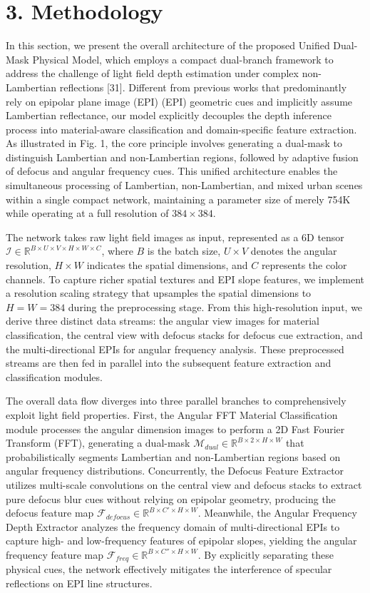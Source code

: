 \section{3. Methodology}

In this section, we present the overall architecture of the proposed Unified Dual-Mask Physical Model, which employs a compact dual-branch framework to address the challenge of light field depth estimation under complex non-Lambertian reflections [31]. Different from previous works that predominantly rely on epipolar plane image (EPI) (EPI) geometric cues and implicitly assume Lambertian reflectance, our model explicitly decouples the depth inference process into material-aware classification and domain-specific feature extraction. As illustrated in Fig. 1, the core principle involves generating a dual-mask to distinguish Lambertian and non-Lambertian regions, followed by adaptive fusion of defocus and angular frequency cues. This unified architecture enables the simultaneous processing of Lambertian, non-Lambertian, and mixed urban scenes within a single compact network, maintaining a parameter size of merely 754K while operating at a full resolution of $384 \times 384$.

The network takes raw light field images as input, represented as a 6D tensor $\mathcal{I} \in \mathbb{R}^{B \times U \times V \times H \times W \times C}$, where $B$ is the batch size, $U \times V$ denotes the angular resolution, $H \times W$ indicates the spatial dimensions, and $C$ represents the color channels. To capture richer spatial textures and EPI slope features, we implement a resolution scaling strategy that upsamples the spatial dimensions to $H=W=384$ during the preprocessing stage. From this high-resolution input, we derive three distinct data streams: the angular view images for material classification, the central view with defocus stacks for defocus cue extraction, and the multi-directional EPIs for angular frequency analysis. These preprocessed streams are then fed in parallel into the subsequent feature extraction and classification modules.

The overall data flow diverges into three parallel branches to comprehensively exploit light field properties. First, the Angular FFT Material Classification module processes the angular dimension images to perform a 2D Fast Fourier Transform (FFT), generating a dual-mask $\mathcal{M}_{dual} \in \mathbb{R}^{B \times 2 \times H \times W}$ that probabilistically segments Lambertian and non-Lambertian regions based on angular frequency distributions. Concurrently, the Defocus Feature Extractor utilizes multi-scale convolutions on the central view and defocus stacks to extract pure defocus blur cues without relying on epipolar geometry, producing the defocus feature map $\mathcal{F}_{defocus} \in \mathbb{R}^{B \times C' \times H \times W}$. Meanwhile, the Angular Frequency Depth Extractor analyzes the frequency domain of multi-directional EPIs to capture high- and low-frequency features of epipolar slopes, yielding the angular frequency feature map $\mathcal{F}_{freq} \in \mathbb{R}^{B \times C'' \times H \times W}$. By explicitly separating these physical cues, the network effectively mitigates the interference of specular reflections on EPI line structures.

